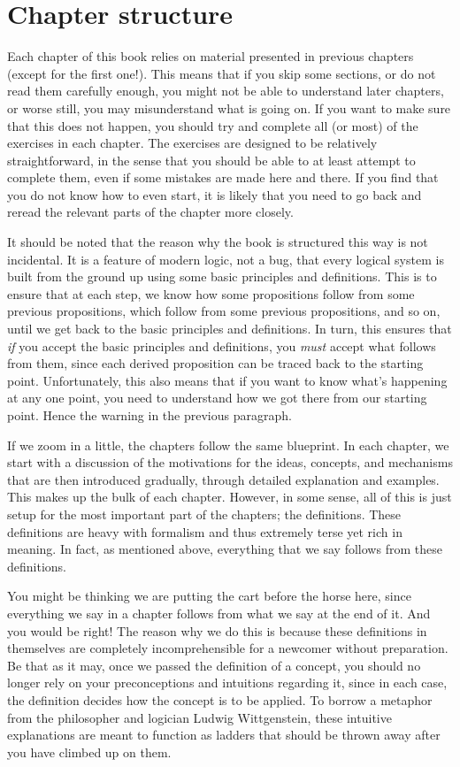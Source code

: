 \section*{Chapter structure}

Each chapter of this book relies on material presented in previous chapters (except for the first one!). This means that if you skip some sections, or do not read them carefully enough, you might not be able to understand later chapters, or worse still, you may misunderstand what is going on. If you want to make sure that this does not happen, you should try and complete all (or most) of the exercises in each chapter. The exercises are designed to be relatively straightforward, in the sense that you should be able to at least attempt to complete them, even if some mistakes are made here and there. If you find that you do not know how to even start, it is likely that you need to go back and reread the relevant parts of the chapter more closely. 

It should be noted that the reason why the book is structured this way is not incidental. It is a feature of modern logic, not a bug, that every logical system is built from the ground up using some basic principles and definitions. This is to ensure that at each step, we know how some propositions follow from some previous propositions, which follow from some previous propositions, and so on, until we get back to the basic principles and definitions. In turn, this ensures that \textit{if} you accept the basic principles and definitions, you \textit{must} accept what follows from them, since each derived proposition can be traced back to the starting point. Unfortunately, this also means that if you want to know what's happening at any one point, you need to understand how we got there from our starting point. Hence the warning in the previous paragraph. 

If we zoom in a little, the chapters follow the same blueprint. In each chapter, we start with a discussion of the motivations for the ideas, concepts, and mechanisms that are then introduced gradually, through detailed explanation and examples. This makes up the bulk of each chapter. However, in some sense, all of this is just setup for the most important part of the chapters; the definitions. These definitions are heavy with formalism and thus extremely terse yet rich in meaning. In fact, as mentioned above, everything that we say follows from these definitions. 

You might be thinking we are putting the cart before the horse here, since everything we say in a chapter follows from what we say at the end of it. And you would be right! The reason why we do this is because these definitions in themselves are completely incomprehensible for a newcomer without preparation. Be that as it may, once we passed the definition of a concept, you should no longer rely on your preconceptions and intuitions regarding it, since in each case, the definition decides how the concept is to be applied. To borrow a metaphor from the philosopher and logician Ludwig Wittgenstein, these intuitive explanations are meant to function as ladders that should be thrown away after you have climbed up on them. 

